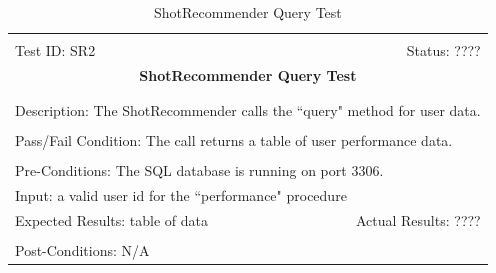 \documentclass[11pt]{article}
\begin{document}
\begin{center}
\begin{table}[H]
\begin{tabular}{|l r|}\hline&\\[-2mm]
	Test ID: SR2	&Status: ????\\[-3mm]
	\multicolumn{2}{|c|}{\textbf{\large{ShotRecommender Query Test}}}\\&\\\hline&\\[-3mm]
	\multicolumn{2}{|p{\textwidth}|}{Description: The ShotRecommender calls the ``query" method for user data.}\\[1mm]\hline&\\[-3mm]
	\multicolumn{2}{|p{\textwidth}|}{Pass/Fail Condition: The call returns a table of user performance data.}\\[1mm]\hline&\\[-3mm]
	\multicolumn{2}{|p{\textwidth}|}{Pre-Conditions: The SQL database is running on port 3306.}\\[4mm]
	\multicolumn{2}{|p{\textwidth}|}{Input: a valid user id for the ``performance" procedure}\\[2mm]\hline
	\multicolumn{1}{|p{0.49\textwidth}}{Expected Results: table of data}	&\multicolumn{1}{|p{0.45\textwidth}|}{Actual Results: ????}\\\hline&\\[-3mm]
	\multicolumn{2}{|p{\textwidth}|}{Post-Conditions: N/A}\\\hline
\end{tabular}
\caption{ShotRecommender Query Test}
\end{table}
\end{center}
\end{document}
